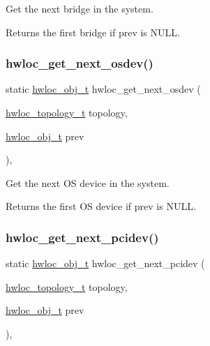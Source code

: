Get the next bridge in the system. 

\begin{DoxyReturn}{Returns}
the first bridge if {\ttfamily prev} is {\ttfamily N\+U\+LL}. 
\end{DoxyReturn}
\mbox{\label{a00204_ga8b4584c8949e2c5f1c97ba7fe92b8145}} 
\subsubsection{\texorpdfstring{hwloc\+\_\+get\+\_\+next\+\_\+osdev()}{hwloc\_get\_next\_osdev()}}
{\footnotesize\ttfamily static \hyperlink{a00185_ga79b8ab56877ef99ac59b833203391c7d}{hwloc\+\_\+obj\+\_\+t} hwloc\+\_\+get\+\_\+next\+\_\+osdev (\begin{DoxyParamCaption}\item[{\hyperlink{a00186_ga9d1e76ee15a7dee158b786c30b6a6e38}{hwloc\+\_\+topology\+\_\+t}}]{topology,  }\item[{\hyperlink{a00185_ga79b8ab56877ef99ac59b833203391c7d}{hwloc\+\_\+obj\+\_\+t}}]{prev }\end{DoxyParamCaption})\hspace{0.3cm}{\ttfamily [inline]}, {\ttfamily [static]}}



Get the next OS device in the system. 

\begin{DoxyReturn}{Returns}
the first OS device if {\ttfamily prev} is {\ttfamily N\+U\+LL}. 
\end{DoxyReturn}
\mbox{\label{a00204_ga66470dabce9db19a57c5940a909d0baa}} 
\subsubsection{\texorpdfstring{hwloc\+\_\+get\+\_\+next\+\_\+pcidev()}{hwloc\_get\_next\_pcidev()}}
{\footnotesize\ttfamily static \hyperlink{a00185_ga79b8ab56877ef99ac59b833203391c7d}{hwloc\+\_\+obj\+\_\+t} hwloc\+\_\+get\+\_\+next\+\_\+pcidev (\begin{DoxyParamCaption}\item[{\hyperlink{a00186_ga9d1e76ee15a7dee158b786c30b6a6e38}{hwloc\+\_\+topology\+\_\+t}}]{topology,  }\item[{\hyperlink{a00185_ga79b8ab56877ef99ac59b833203391c7d}{hwloc\+\_\+obj\+\_\+t}}]{prev }\end{DoxyParamCaption})\hspace{0.3cm}{\ttfamily [inline]}, {\ttfamily [static]}}



